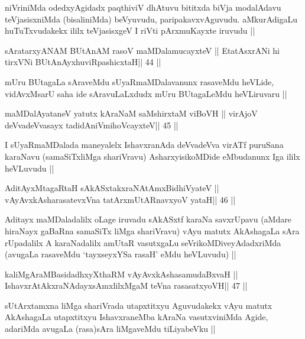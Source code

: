 \begin{artha}
niVriniMda odedxyAgidadx paqthiviV dhAtuvu bititxda biVja modalAdavu
teVjasisxniMda (bisaliniMda) beVyuvudu, paripakavxvAguvudu.
aMkurAdigaLu huTuTxvudakekx ililx teVjasisxgeV I riVti pArxmuKayxte
iruvudu ||
\end{artha}

\begin{shl}
sAratarxyANAM BUtAnAM rasoV maMDalamucayxteV ||
EtatAsxrANi hi tirxVNi BUtAnAyxhuviRpashicxtaH\hfill || 44 ||
\end{shl}

\begin{artha}
mUru BUtagaLa sAraveMdu sUyaRmaMDalavanunx rasaveMdu heVLide,
vidAvxMsarU saha ide sAravuLaLxdudx mUru BUtagaLeMdu heVLiruvaru ||
\end{artha}

\begin{shl}
maMDalAyataneV yatutx kAraNaM saMshirxtaM viBoVH ||
virAjoV deVvadeVvasayx tadidAniVmihoVcayxteV\hfill || 45 ||
\end{shl}

\begin{artha}
I sUyaRmaMDalada maneyalelx IshavxranAda deVvadeVva virATf puruSana
karaNavu (samaSiTxliMga shariVravu) AsharxyisikoMDide eMbudanunx Iga
ililx heVLuvudu ||
\end{artha}

\begin{shl}
AditAyxMtagaRtaH sAkASxtakxraNAtAmx\s BidhiVyateV ||
vAyAvxkAsharasatevxVna tatArxmUtARnavxyoV yataH\hfill || 46 ||
\end{shl}

\begin{artha}
Aditayx maMDaladalilx oLage iruvadu sAkASxtf karaNa savxrUpavu (aMdare
hiraNayx gaBaRna samaSiTx liMga shariVravu) vAyu matutx AkAshagaLa
sAra rUpadalilx A karaNadalilx amUtaR vasutxgaLu
seVrikoMDiveyAdadxriMda (avugaLa rasaveMdu `tayxseyxYSa rasaH' eMdu
heVLuvudu) ||
\end{artha}

\begin{shl}
kaliMgAraMBasidadhxyXthaRM vAyAvxkAshasamudaBxvaH ||
IshavxrAtAkxraNAdayxsAmxlilxMgaM teVna rasasatxyoVH\hfill || 47 ||
\end{shl}

\begin{artha}
sUtArxtamxna liMga shariVrada utapxtitxyu Aguvudakekx vAyu matutx
AkAshagaLa utapxtitxyu IshavxraneMba kAraNa vasutxviniMda Agide,
adariMda avugaLa (rasa)sAra liMgaveMdu tiLiyabeVku ||
\end{artha}

